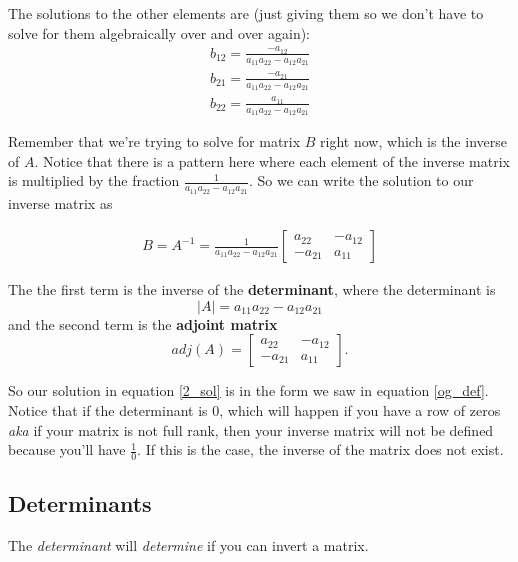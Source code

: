 \documentclass{article}
\begin{document}
The solutions to the other elements are (just giving them so we don't have to solve for them algebraically over and over again): 
\begin{align}
    b_{12} = \frac{-a_{12}}{a_{11} a_{22} - a_{12} a_{21}}\\
    b_{21} = \frac{-a_{21}}{a_{11} a_{22} - a_{12} a_{21}} \\
    b_{22} = \frac{a_{11}}{a_{11} a_{22} - a_{12} a_{21}} 
\end{align}

Remember that we're trying to solve for matrix $B$ right now, which is the inverse of $A$. Notice that there is a pattern here where each element of the inverse matrix is multiplied by the fraction $\frac{1}{a_{11} a_{22} - a_{12} a_{21}}$. So we can write the solution to our inverse matrix as 

\begin{align}
    B = A^{-1} = \frac{1}{a_{11} a_{22} - a_{12} a_{21}} \begin{bmatrix}
        a_{22} & -a_{12}\\
        -a_{21} & a_{11}
    \end{bmatrix} \label{2_sol}
\end{align}

The the first term is the inverse of the \textbf{determinant}, where the determinant is \[|A| = a_{11} a_{22} - a_{12} a_{21}\] and the second term is the \textbf{adjoint matrix} \[adj(A) = \begin{bmatrix}
        a_{22} & -a_{12}\\
        -a_{21} & a_{11}
    \end{bmatrix}.\]

So our solution in equation \ref{2_sol} is in the form we saw in equation \ref{og_def}. \\

Notice that if the determinant is 0, which will happen if you have a row of zeros \textit{aka} if your matrix is not full rank, then your inverse matrix will not be defined because you'll have $\frac{1}{0}.$ If this is the case, the inverse of the matrix does not exist.\\

\subsection{Determinants}

The \textit{determinant} will \textit{determine} if you can invert a matrix. \\
\end{document}
